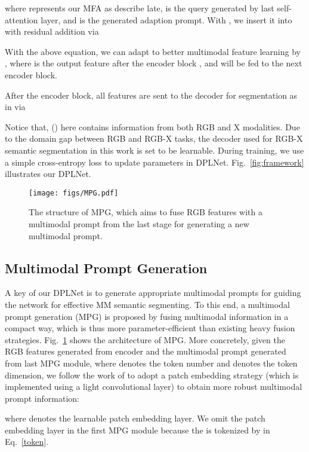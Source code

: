 \documentclass[10pt,twocolumn,letterpaper]{article}
\begin{document}
where  represents our MFA as describe late,  is the query generated by last self-attention layer, and  is the generated adaption prompt. With , we insert it into  with residual addition via

With the above equation, we can adapt  to better multimodal feature learning by , where  is the output feature after the encoder block , and will be fed to the next encoder block. 

After the  encoder block, all features  are sent to the decoder for segmentation as in  via 


Notice that,  () here contains information from both RGB and X modalities. Due to the domain gap between RGB and RGB-X tasks, the decoder used for RGB-X semantic segmentation in this work is set to be learnable. During training, we use a simple cross-entropy loss to update parameters in DPLNet. Fig.~\ref{fig:framework} illustrates our DPLNet.

\begin{figure}[t]
 \centering
 \texttt{[image: figs/MPG.pdf]}
\caption{The structure of MPG, which aims to fuse RGB features with a multimodal prompt from the last stage for generating a new multimodal prompt.}
 \label{fig:MPG}
 \vspace{-2mm}
\end{figure}

\subsection{Multimodal Prompt Generation}
\label{mpg}
A key of our DPLNet is to generate appropriate multimodal prompts for guiding the network for effective MM semantic segmenting. To this end, a multimodal prompt generation (MPG) is proposed by fusing multimodal information in a compact way, which is thus more parameter-efficient than existing heavy fusion strategies. Fig.~\ref{fig:MPG} shows the architecture of MPG.
More concretely, given the RGB features  generated from encoder  and the multimodal prompt  generated from last MPG module, where  denotes the token number and  denotes the token dimension, we follow the work of \cite{segformer} to adopt a patch embedding strategy (which is implemented using a light  convolutional layer) to obtain more robust multimodal prompt information:

where  denotes the learnable patch embedding layer. We omit the patch embedding layer in the first MPG module because the  is tokenized by  in Eq.~\ref{token}.
\end{document}

